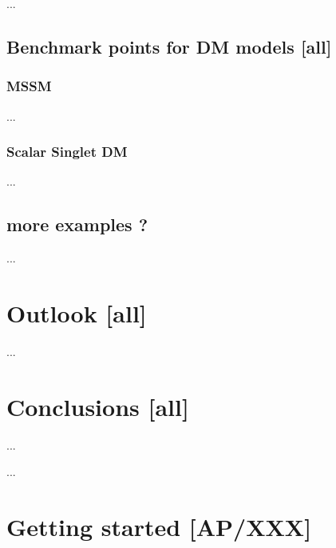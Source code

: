 \medskip
...


\subsection{Benchmark points for DM models {\bf [all]}}

\subsubsection{MSSM}
...

\subsubsection{Scalar Singlet DM}
...

\subsection{more examples ?}
...

\section{Outlook {\bf [all]}}
\label{out}

...

\section{Conclusions {\bf [all]} }
\label{conc}

...

\begin{acknowledgements}
...
\end{acknowledgements}



\appendix
\label{}

\section{Getting started  {\bf [AP/XXX]}}
\label{code_init}


